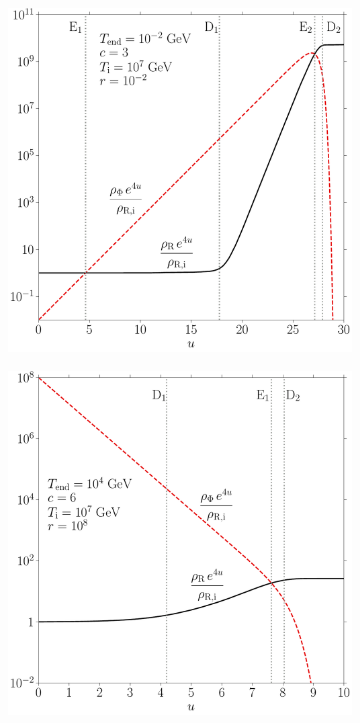 \documentclass[11pt,a4paper]{article}
\begin{document}
\begin{center}
	\begin{figure}[t!]
		\begin{subfigure}{0.5\textwidth}
			\includegraphics[width=1\textwidth]{EMD.pdf}
			\caption{}
			\label{fig:EMD}
		\end{subfigure}
		\begin{subfigure}{0.5\textwidth}
			\includegraphics[width=1\textwidth]{EKD.pdf}

\end{subfigure}
\end{figure}
\end{center}
\end{document}
